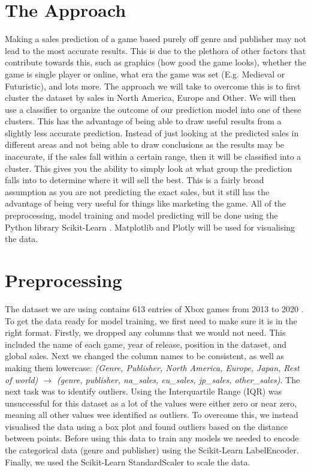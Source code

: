 \documentclass[english]{article}
\begin{document}
\section{The Approach}
Making a sales prediction of a game based purely off genre and publisher may not lead to the most accurate results. This is due to the plethora of other factors that contribute towards this, such as graphics (how good the game looks), whether the game is single player or online, what era the game was set (E.g. Medieval or Futuristic), and lots more. The approach we will take to overcome this is to first cluster the dataset by sales in North America, Europe and Other. We will then use a classifier to organize the outcome of our prediction model into one of these clusters. This has the advantage of being able to draw useful results from a slightly less accurate prediction. Instead of just looking at the predicted sales in different areas and not being able to draw conclusions as the results may be inaccurate, if the sales fall within a certain range, then it will be classified into a cluster. This gives you the ability to simply look at what group the prediction falls into to determine where it will sell the best. This is a fairly broad assumption as you are not predicting the exact sales, but it still has the advantage of being very useful for things like marketing the game. All of the preprocessing, model training and model predicting will be done using the Python library Scikit-Learn \cite{noauthor_scikit-learn_nodate}. Matplotlib \cite{noauthor_matplotlib_nodate} and Plotly \cite{noauthor_plotly_nodate} will be used for visualising the data.

\section{Preprocessing}
The dataset we are using contains 613 entries of Xbox games from 2013 to 2020 \cite{noauthor_video_nodate}. To get the data ready for model training, we first need to make sure it is in the right format. Firstly, we dropped any columns that we would not need. This included the name of each game, year of release, position in the dataset, and global sales. Next we changed the column names to be consistent, as well as making them lowercase: 
\textit{(Genre, Publisher, North America, Europe, Japan, Rest of world) $\rightarrow$ (genre, publisher, na\_sales, eu\_sales, jp\_sales, other\_sales)}. The next task was to identify outliers. Using the Interquartile Range (IQR) was unsuccessful for this dataset as a lot of the values were either zero or near zero, meaning all other values wee identified as outliers. To overcome this, we instead visualised the data using a box plot and found outliers based on the distance between points. Before using this data to train any models we needed to encode the categorical data (genre and publisher) using the Scikit-Learn LabelEncoder. Finally, we used the Scikit-Learn StandardScaler to scale the data.
\end{document}

